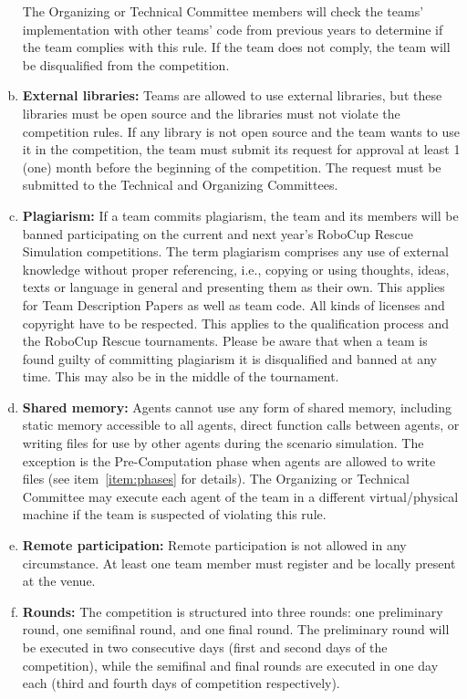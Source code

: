 \documentclass{article}
\begin{document}
\begin{enumerate}[(a)]
The Organizing or Technical Committee members will check the teams' implementation with other teams' code from previous years to determine if the team complies with this rule. If the team does not comply, the team will be disqualified from the competition.
\item \textbf{External libraries:} Teams are allowed to use external libraries, but these libraries must be open source and the libraries must not violate the competition rules. If any library is not open source and the team wants to use it in the competition, the team must submit its request for approval at least 1 (one) month before the beginning of the competition. The request must be submitted to the Technical and Organizing Committees.
\item \textbf{Plagiarism:} If a team commits plagiarism, the team and its members will be banned participating on the current and next year's RoboCup Rescue Simulation competitions. The term plagiarism comprises any use of external knowledge without proper referencing, i.e., copying or using thoughts, ideas, texts or language in general and presenting them as their own. This applies for Team Description Papers as well as team code. All kinds of licenses and copyright have to be respected. This applies to the qualification process and the RoboCup Rescue tournaments. Please be aware that when a team is found guilty of committing plagiarism it is disqualified and banned at any time. This may also be in the middle of the tournament.
\item \textbf{Shared memory:} Agents cannot use any form of shared memory, including static memory accessible to all agents, direct function calls between agents, or writing files for use by other agents during the scenario simulation. The exception is the Pre-Computation phase when agents are allowed to write files (see item~\ref{item:phases} for details). The Organizing or Technical Committee may execute each agent of the team in a different virtual/physical machine if the team is suspected of violating this rule.
\item \textbf{Remote participation:} Remote participation is not allowed in any circumstance. At least one team member must register and be locally present at the venue.
\item \textbf{Rounds:} The competition is structured into three rounds: one preliminary round, one semifinal round, and one final round. The preliminary round will be executed in two consecutive days (first and second days of the competition), while the semifinal and final rounds are executed in one day each (third and fourth days of competition respectively).

\end{enumerate}
\end{document}
